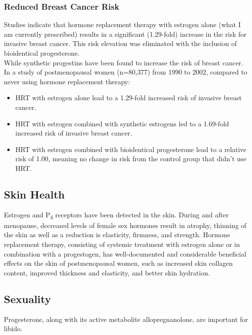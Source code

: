 \documentclass[
	secnumdepth=3, %
]{kaohandt}
\newcommand\tsub[1]{\textsubscript{#1}}
\begin{document}
\subsubsection{Reduced Breast Cancer Risk}
Studies indicate that hormone replacement therapy with estrogen alone (what I am currently prescribed) results in a significant (1.29-fold) increase in the risk for invasive breast cancer. This risk elevation was eliminated with the inclusion of bioidentical progesterone.\\

\noindent While synthetic progestins have been found to increase the risk of breast cancer. In a study of postmenopausal women (n=80,377) from 1990 to 2002, compared to never using hormone replacement therapy:
\begin{itemize}
    \item HRT with estrogen alone lead to a 1.29-fold increased risk of invasive breast cancer.
    \item HRT with estrogen combined with synthetic estrogens led to a 1.69-fold increased risk of invasive breast cancer.
    \item HRT with estrogen combined with bioidentical progesterone lead to a relative risk of 1.00, meaning no change in risk from the control group that didn't use HRT.
\end{itemize}

\subsection{Skin Health}
Estrogen and P\tsub{4} receptors have been detected in the skin. During and after menopause, decreased levels of female sex hormones result in atrophy, thinning of the skin as well as a reduction is elasticity, firmness, and strength. Hormone replacement therapy, consisting of systemic treatment with estrogen alone or in combination with a progestogen, has well-documented and considerable beneficial effects on the skin of postmenopausal women, such as increased skin collagen content, improved thickness and elasticity, and better skin hydration.

\subsection{Sexuality}
Progesterone, along with its active metabolite allopregnanolone, are important for libido.
\end{document}
